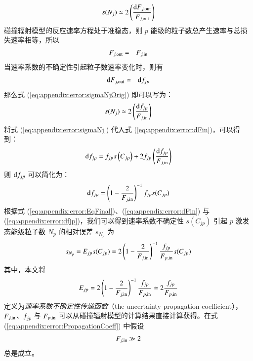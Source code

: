\begin{eqnarray}
s(N_j)\simeq 2\left(\frac{{\rm d}F_{j,{\rm out}}}{F_{j,{\rm out}}}\right)
\label{eq:appendix:error:sigmaNjOrig}
\end{eqnarray}
碰撞辐射模型的反应速率方程处于准稳态，则 $p$ 能级的粒子数总产生速率与总损失速率相等，所以
\begin{eqnarray}
F_{j,{\rm out}}&=&F_{j,{\rm in}}
\label{eq:appendix:error:FjinANDdFjin}
\end{eqnarray}
当速率系数的不确定性引起粒子数速率变化时，则有
\begin{eqnarray}
{\rm d}F_{j,{\rm out}}&\simeq&{\rm d}f_{jp}
\label{eq:appendix:error:dFjinANDdFjin}
\end{eqnarray}
那么式 (\ref{eq:appendix:error:sigmaNjOrig}) 即可以写为：
\begin{eqnarray}
s(N_j)\simeq 2\left(\frac{{\rm d}f_{jp}}{F_{j,{\rm in}}}\right)
\label{eq:appendix:error:sigmaNj}
\end{eqnarray}
将式 (\ref{eq:appendix:error:sigmaNj}) 代入式 (\ref{eq:appendix:error:dFin})，可以得到：
\begin{eqnarray}
{\rm d}f_{jp}=f_{jp}s\left(C_{jp}\right)+2f_{jp}\left(\frac{{\rm d}f_{jp}}{F_{j,{\rm in}}}\right)
\label{eq:appendix:error:dfjpEq}
\end{eqnarray}
则 ${\rm d}f_{jp}$ 可以简化为：
\begin{eqnarray}
{\rm d}f_{jp}=\left(1-\frac{2}{F_{j,{\rm in}}}\right)^{-1}f_{jp}s(C_{jp})
\label{eq:appendix:error:dfjp}
\end{eqnarray}
根据式 (\ref{eq:appendix:error:EqFinal})、(\ref{eq:appendix:error:dFin}) 与 (\ref{eq:appendix:error:dfjp})，我们可以得到速率系数不确定性 $s(C_{jp})$ 引起 $p$ 激发态能级粒子数 $N_p$ 的相对误差 $s_{N_p}$ 为
\begin{eqnarray}
s_{N_p}=E_{jp}s(C_{jp})=2\left(1-\frac{2}{F_{j,{\rm in}}}\right)^{-1}\frac{f_{jp}}{F_{p,{\rm in}}}s(C_{jp})
\label{eq:appendix:error:Propagation}
\end{eqnarray}
其中，本文将
\begin{eqnarray}
E_{jp}=2\left(1-\frac{2}{F_{j,{\rm in}}}\right)^{-1}\frac{f_{jp}}{F_{p,{\rm in}}}
\simeq 2\frac{f_{jp}}{F_{p,{\rm in}}}
\label{eq:appendix:error:PropagationCoeff}
\end{eqnarray}
定义为\emph{速率系数不确定性传递函数}（the uncertainty propagation coefficient），$F_{j,{\rm in}}$、$f_{jp}$ 与 $F_{p,{\rm in}}$ 可以从碰撞辐射模型的计算结果直接计算获得。在式(\ref{eq:appendix:error:PropagationCoeff}) 中假设
\begin{eqnarray}
F_{j,{\rm in}}\gg 2
\label{eq:appendix:error:FjinLargerThan2}
\end{eqnarray}
总是成立。


